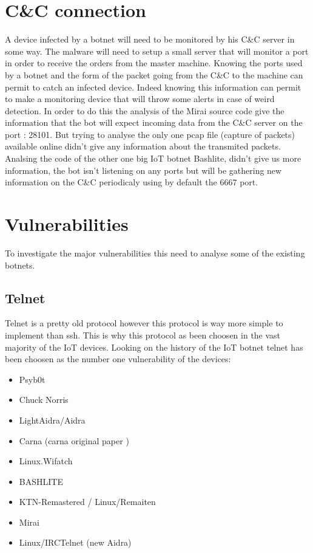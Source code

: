 \documentclass{report}
\begin{document}
\section{C\&C connection}
A device infected by a botnet will need to be monitored by his C\&C server in some way. The malware will need to setup a small server that will monitor a port in order to receive the orders from the master machine. Knowing the ports used by a botnet and the form of the packet going from the C\&C to the machine can permit to catch an infected device. Indeed knowing this information can permit to make a monitoring device that will throw some alerts in case of weird detection.\newline
In order to do this the analysis of the Mirai source code give the information that the bot will expect incoming data from the C\&C server on the port : 28101.
But trying to analyse the only one pcap file (capture of packets) available online didn't give any information about the transmited packets.
Analsing the code of the other one big IoT botnet Bashlite, didn't give us more information, the bot isn't listening on any ports but will be gathering new information on the C\&C periodicaly using by default the 6667 port.

\section{Vulnerabilities}
To investigate the major vulnerabilities this need to analyse some of the existing botnets.

\subsection{Telnet}
Telnet is a pretty old protocol \autocite{davidson1977arpanet} however this protocol is way more simple to implement than ssh. This is why this protocol as been choosen in the vast majority of the IoT devices. Looking on the history of the IoT botnet telnet has been choosen as the number one vulnerability of the devices:

\begin{itemize}
 \item Psyb0t \autocite{durfina2013psybot}
 \item Chuck Norris \autocite{celeda2010embedded}
 \item LightAidra/Aidra \autocite{aidra}
 \item Carna \autocite{krenc2014internet} (carna original paper \autocite{carna})
 \item Linux.Wifatch \autocite{wifatch}
 \item BASHLITE \autocite{bashlite}
 \item KTN-Remastered / Linux/Remaiten \autocite{remaiten}
 \item Mirai \autocite{kolias2017ddos}
 \item Linux/IRCTelnet (new Aidra) \autocite{irctelnet}
\end{itemize}
\end{document}
